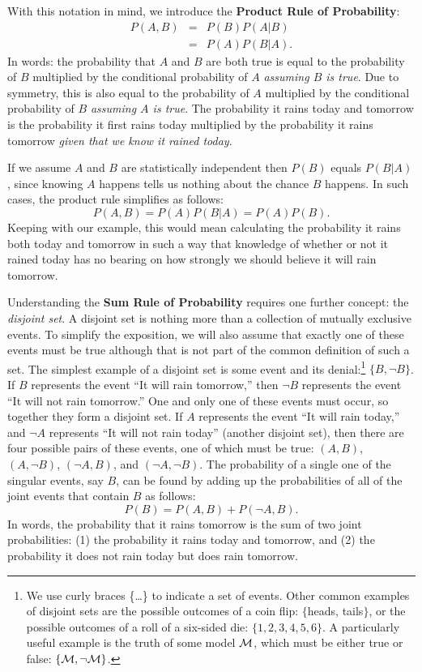 With this notation in mind, we introduce the \textbf{Product Rule of Probability}:
\begin{equation}
\begin{array}{rcl}
P(A,B) &=& P(B)P(A|B)\\ 
&=& P(A)P(B|A).
\end{array}
\label{eq:prodrule}
\end{equation}
In words: the probability that $A$ and $B$ are both true is equal to the probability of $B$ multiplied by the conditional probability of $A$ \textit{assuming $B$ is true}.  Due to symmetry, this is also equal to the probability of $A$ multiplied by the conditional probability of $B$ \textit{assuming $A$ is true}. The probability it rains today and tomorrow is the probability it first rains today multiplied by the probability it rains tomorrow \textit{given that we know it rained today}.

If we assume $A$ and $B$ are statistically independent then $P(B)$ equals $P(B|A)$, since knowing $A$ happens tells us nothing about the chance $B$ happens. In such cases, the product rule simplifies as follows:
\begin{equation}
P(A,B) = P(A)P(B|A) = P(A)P(B).
\label{eq:indep}
\end{equation}
Keeping with our example, this would mean calculating the probability it rains both today and tomorrow in such a way that knowledge of whether or not it rained today has no bearing on how strongly we should believe it will rain tomorrow.

Understanding the \textbf{Sum Rule of Probability} requires one further concept: the \emph{disjoint set}.  A disjoint set is nothing more than a collection of mutually exclusive events. To simplify the exposition, we will also assume that exactly one of these events must be true although that is not part of the common definition of such a set. The simplest example of a disjoint set is some event and its denial:\footnote{We use curly braces \{\ldots\} to indicate a set of events. Other common examples of disjoint sets are the possible outcomes of a coin flip: $\{$heads, tails$\}$, or the possible outcomes of a roll of a six-sided die: $\{1, 2, 3, 4, 5, 6\}$. A particularly useful example is the truth of some model ${\cal M}$, which must be either true or false: $\{{\cal M}, \neg{{\cal M}}\}$.} $\{B, \neg{B}\}$. If $B$ represents the event ``It will rain tomorrow,'' then $\neg{B}$ represents the event ``It will not rain tomorrow.'' One and only one of these events must occur, so together they form a disjoint set. If $A$ represents the event ``It will rain today,'' and $\neg{A}$ represents ``It will not rain today'' (another disjoint set), then there are four possible pairs of these events, one of which must be true: $(A,B)$, $(A,\neg{B})$, $(\neg{A},B)$, and $(\neg{A},\neg{B})$. The probability of a single one of the singular events, say $B$, can be found by adding up the probabilities of all of the joint events that contain $B$ as follows: $${P(B) = P(A,B) + P(\neg A, B)}.$$ In words, the probability that it rains tomorrow is the sum of two joint probabilities: (1) the probability it rains today and tomorrow, and (2) the probability it does not rain today but does rain tomorrow. 

